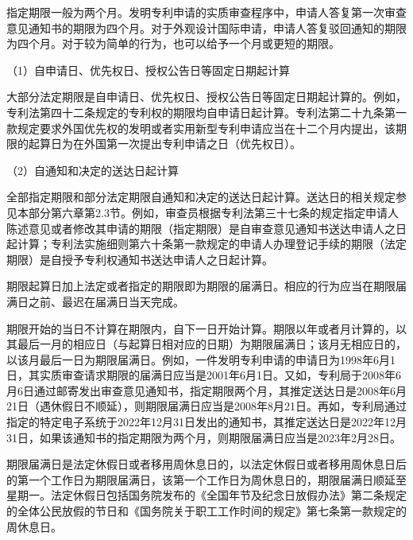 指定期限一般为两个月。发明专利申请的实质审查程序中，申请人答复第一次审查意见通知书的期限为四个月。对于外观设计国际申请，申请人答复驳回通知的期限为四个月。对于较为简单的行为，也可以给予一个月或更短的期限。

{\setlength{\parindent}{17.1bp}（1）自申请日、优先权日、授权公告日等固定日期起计算\par}

大部分法定期限是自申请日、优先权日、授权公告日等固定日期起计算的。例如，专利法第四十二条规定的专利权的期限均自申请日起计算。专利法第二十九条第一款规定要求外国优先权的发明或者实用新型专利申请应当在十二个月内提出，该期限的起算日为在外国第一次提出专利申请之日（优先权日）。

{\setlength{\parindent}{17.1bp}（2）自通知和决定的送达日起计算\par}

全部指定期限和部分法定期限自通知和决定的送达日起计算。送达日的相关规定参见本部分第六章第2.3节。例如，审查员根据专利法第三十七条的规定指定申请人陈述意见或者修改其申请的期限（指定期限）是自审查意见通知书送达申请人之日起计算；专利法实施细则第六十条第一款规定的申请人办理登记手续的期限（法定期限）是自授予专利权通知书送达申请人之日起计算。

期限起算日加上法定或者指定的期限即为期限的届满日。相应的行为应当在期限届满日之前、最迟在届满日当天完成。

期限开始的当日不计算在期限内，自下一日开始计算。期限以年或者月计算的，以其最后一月的相应日（与起算日相对应的日期）为期限届满日；该月无相应日的，以该月最后一日为期限届满日。例如，一件发明专利申请的申请日为1998年6月1日，其实质审查请求期限的届满日应当是2001年6月1日。又如，专利局于2008年6月6日通过邮寄发出审查意见通知书，指定期限两个月，其推定送达日是2008年6月21日（遇休假日不顺延），则期限届满日应当是2008年8月21日。再如，专利局通过指定的特定电子系统于2022年12月31日发出的通知书，其推定送达日是2022年12月31日，如果该通知书的指定期限为两个月，则期限届满日应当是2023年2月28日。

期限届满日是法定休假日或者移用周休息日的，以法定休假日或者移用周休息日后的第一个工作日为期限届满日，该第一个工作日为周休息日的，期限届满日顺延至星期一。法定休假日包括国务院发布的《全国年节及纪念日放假办法》第二条规定的全体公民放假的节日和《国务院关于职工工作时间的规定》第七条第一款规定的周休息日。

